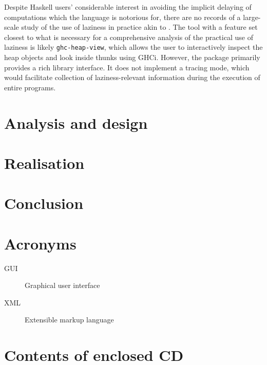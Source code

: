 \documentclass[thesis=B,english]{FITthesis}[2019/12/23]
\begin{document}
Despite Haskell users' considerable interest in avoiding the implicit delaying
of computations which the language is notorious for, there are no records of a
large-scale study of the use of laziness in practice akin to
\cite{emp-study-laziness-r}. The tool with a feature set closest to what is
necessary for a comprehensive analysis of the practical use of laziness is
likely \texttt{ghc-heap-view}, which allows the user to interactively inspect
the heap objects and look inside thunks using GHCi. However, the package
primarily provides a rich library interface. It does not implement a tracing
mode, which would facilitate collection of laziness-relevant information during
the execution of entire programs.

\chapter{Analysis and design}

\chapter{Realisation}

\chapter{Conclusion}





\appendix

\chapter{Acronyms}
\begin{description}
	\item[GUI] Graphical user interface
	\item[XML] Extensible markup language
\end{description}


\chapter{Contents of enclosed CD}


\begin{figure}
\end{figure}
\end{document}
